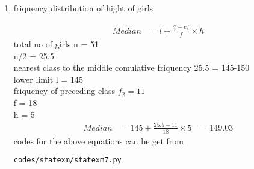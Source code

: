 \renewcommand{\theequation}{\theenumi}
\begin{enumerate}[label=\arabic*.,ref=\thesubsection.\theenumi]
\item
\begin{table}[!ht]
	\centering
	
	\caption{friquency distribution of hight of girls}
\end{table}
\begin{align}
Median &= l + \frac{\frac{n}{2} - cf}{f}\times h
\end{align}
total no of girls n = 51
\\
n/2 = 25.5
\\
nearest class to the middle comulative friquency 25.5 = 145-150
\\
lower limit l = 145
\\
friquency of preceding class $f_2 = 11$
\\
f = 18
\\
h = 5
\begin{align}
Median &= 145 + \frac{25.5 - 11}{18}\times 5
&= 149.03
\end{align}
codes for the above equations can be get from
\begin{lstlisting}
codes/statexm/statexm7.py
\end{lstlisting}
\end{enumerate}